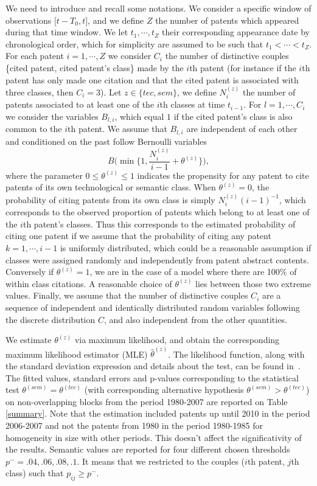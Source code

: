 We need to introduce and recall some notations. We consider a specific window of observations $\big[t- T_0, t \big]$, and we define $Z$ the number of patents which appeared during that time window. We let $t_1, \cdots, t_Z$ their corresponding appearance date by chronological order, which for simplicity are assumed to be such that $t_1 < \cdots < t_Z$. For each patent $i=1, \cdots, Z$ we consider $C_i$ the number of distinctive couples \{cited patent, cited patent's class\} made by the $i$th patent (for instance if the $i$th patent has only made one citation and that the cited patent is associated with three classes, then $C_i = 3$). Let $z \in \{tec, sem\}$, we define $N_{i}^{(z)}$  the number of patents associated to at least one of the $i$th classes at time $t_{i-1}$. For $l = 1, \cdots, C_i$ we consider the variables $B_{l,i}$, which equal $1$ if the cited patent's class is also common to the $i$th patent. We assume that $B_{l,i}$ are independent of each other and conditioned on the past follow Bernoulli variables 
$$B \Big( \min \Big\{ 1, \frac{N_{i}^{(z)}}{i-1} + \theta^{(z)} \Big\} \Big),$$ 
where the parameter $0 \leq \theta^{(z)} \leq 1$ indicates the propensity for any patent to cite patents of its own technological or semantic class. When $\theta^{(z)} = 0$, the probability of citing patents from its own class is simply $N_{i}^{(z)}(i-1)^{-1}$, which corresponds to the observed proportion of patents which belong to at least one of the $i$th patent's classes. Thus this corresponds to the estimated probability of citing one patent if we assume that the probability of citing any patent $k=1, \cdots, i-1$ is uniformly distributed, which could be a reasonable assumption if classes were assigned randomly and independently from patent abstract contents. Conversely if $\theta^{(z)} = 1$, we are in the case of a model where there are 100\% of within class citations. A reasonable choice of $\theta^{(z)}$ lies between those two extreme values. Finally, we assume that the number of distinctive couples $C_i$ are a sequence of independent and identically distributed random variables following the discrete distribution $C$, and also independent from the other quantities.

We estimate $\theta^{(z)}$ via maximum likelihood, and obtain the corresponding maximum likelihood estimator (MLE) $\hat{\theta}^{(z)}$. The likelihood function, along with the standard deviation expression and details about the test, can be found in~. The fitted values, standard errors and p-values corresponding to the statistical test $\theta^{(sem)} = \theta^{(tec)}$ (with corresponding alternative hypothesis $\theta^{(sem)} > \theta^{(tec)}$) on non-overlapping blocks from the period 1980-2007 are reported on Table \ref{summary}. Note that the estimation included patents up until 2010 in the period 2006-2007 and not the patents from 1980 in the period 1980-1985 for homogeneity in size with other periods. This doesn't affect the significativity of the results. Semantic values are reported for four different chosen thresholds $p^{-}=.04, .06, .08, .1$. It means that we restricted to the couples ($i$th patent, $j$th class) such that $p_{ij} \geq p^{-}$. 

